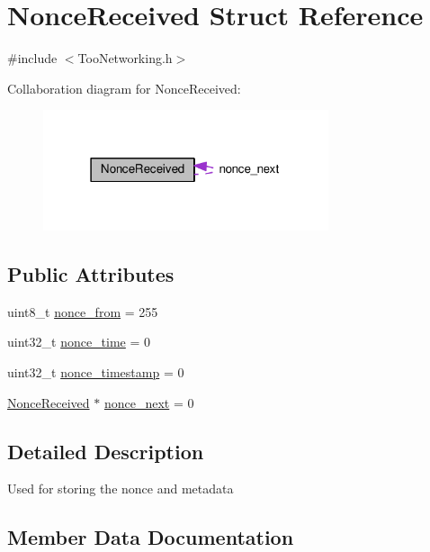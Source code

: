 \hypertarget{structNonceReceived}{}\section{Nonce\+Received Struct Reference}
\label{structNonceReceived}


{\ttfamily \#include $<$Too\+Networking.\+h$>$}



Collaboration diagram for Nonce\+Received\+:
\nopagebreak
\begin{figure}[H]
\begin{center}
\leavevmode
\includegraphics[width=238pt]{structNonceReceived__coll__graph}
\end{center}
\end{figure}
\subsection*{Public Attributes}
\begin{DoxyCompactItemize}
\item 
uint8\+\_\+t \hyperlink{structNonceReceived_aa6f2777bb591400ce057bd1fa9b23fca}{nonce\+\_\+from} = 255
\item 
uint32\+\_\+t \hyperlink{structNonceReceived_adce029bb8f1d7bb73522ed06efca86c0}{nonce\+\_\+time} = 0
\item 
uint32\+\_\+t \hyperlink{structNonceReceived_a39c9b5816fb33fe66f80c8bf98eca7d5}{nonce\+\_\+timestamp} = 0
\item 
\hyperlink{structNonceReceived}{Nonce\+Received} $\ast$ \hyperlink{structNonceReceived_abfc581a902d83cac731aa843feeea5e2}{nonce\+\_\+next} = 0
\end{DoxyCompactItemize}


\subsection{Detailed Description}
Used for storing the nonce and metadata 

\subsection{Member Data Documentation}
\mbox{\label{structNonceReceived_aa6f2777bb591400ce057bd1fa9b23fca}} 
